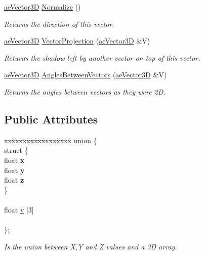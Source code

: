 \begin{DoxyCompactItemize}
\hyperlink{structae_core_1_1ae_vector3_d}{ae\+Vector3D} \hyperlink{structae_core_1_1ae_vector3_d_af6217828e9f80968e5f800af66d14156}{Normalize} ()
\begin{DoxyCompactList}\small\item\em Returns the direction of this vector. \end{DoxyCompactList}\item 
\hyperlink{structae_core_1_1ae_vector3_d}{ae\+Vector3D} \hyperlink{structae_core_1_1ae_vector3_d_a658aa4a30c04ff8592e7a1b216dcc021}{Vector\+Projection} (\hyperlink{structae_core_1_1ae_vector3_d}{ae\+Vector3D} \&V)
\begin{DoxyCompactList}\small\item\em Returns the shadow left by another vector on top of this vector. \end{DoxyCompactList}\item 
\hyperlink{structae_core_1_1ae_vector3_d}{ae\+Vector3D} \hyperlink{structae_core_1_1ae_vector3_d_af0106880887d974adf2a63c03c4420fb}{Angles\+Between\+Vectors} (\hyperlink{structae_core_1_1ae_vector3_d}{ae\+Vector3D} \&V)
\begin{DoxyCompactList}\small\item\em Returns the angles between vectors as they were 2D. \end{DoxyCompactList}\end{DoxyCompactItemize}
\subsection*{Public Attributes}
\begin{DoxyCompactItemize}
\item 
\begin{tabbing}
xx\=xx\=xx\=xx\=xx\=xx\=xx\=xx\=xx\=\kill
union \{\\
\>struct \{\\
\>\>float {\bfseries x}\\
\>\>float {\bfseries y}\\
\>\>float {\bfseries z}\\
\>\} \hypertarget{unionae_core_1_1ae_vector3_d_1_1_0D26_a6e8361d19f0b1f42db727f13494ac8f8}{}\label{unionae_core_1_1ae_vector3_d_1_1_0D26_a6e8361d19f0b1f42db727f13494ac8f8}
\\
\>\>\\
\>float \hyperlink{structae_core_1_1ae_vector3_d_a461e846f7e6d35da6638f94759ae4252}{v} \mbox{[}3\mbox{]}\\
\>\>\\
\}; \hypertarget{structae_core_1_1ae_vector3_d_a78832faf2157131605df885389f50610}{}\label{structae_core_1_1ae_vector3_d_a78832faf2157131605df885389f50610}
\\

\end{tabbing}\begin{DoxyCompactList}\small\item\em Is the union between X,Y and Z values and a 3D array. \end{DoxyCompactList}\end{DoxyCompactItemize}


